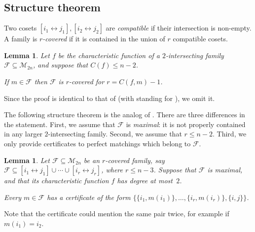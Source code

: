 \documentclass{article}
\newtheorem{lemma}[theorem]{Lemma}
\theoremstyle{definition}
\providecommand{\dcoset}[2]{[#1 \leftrightarrow #2]}
\providecommand{\cM}{\mathcal{M}}
\begin{document}
\subsection{Structure theorem} \label{sec:structure-pms}

Two cosets $\dcoset{i_1}{j_1},\dcoset{i_2}{j_2}$ are \emph{compatible} if their intersection is non-empty. A family is \emph{$r$-covered} if it is contained in the union of $r$ compatible cosets.

\begin{lemma} \label{lem:covering-pms}
Let $f$ be the characteristic function of a $2$-intersecting family $\mathcal{F} \subseteq \cM_{2n}$, and suppose that $C(f) \leq n-2$.

If $m \in \mathcal{F}$ then $\mathcal{F}$ is $r$-covered for $r = C(f,m) - 1$.
\end{lemma}

Since the proof is identical to that of  (with  standing for ), we omit it.

The following structure theorem is the analog of . There are three differences in the statement. First, we assume that $\mathcal{F}$ is \emph{maximal}: it is not properly contained in any larger $2$-intersecting family. Second, we assume that $r \leq n-2$. Third, we only provide certificates to perfect matchings which belong to $\mathcal{F}$.

\begin{lemma} \label{lem:structure-pms}
Let $\mathcal{F} \subseteq \cM_{2n}$ be an $r$-covered family, say $\mathcal{F} \subseteq \dcoset{i_1}{j_1} \cup \cdots \cup \dcoset{i_r}{j_r}$, where $r \leq n-3$. Suppose that $\mathcal{F}$ is maximal, and that its characteristic function $f$ has degree at most~$2$.

Every $m \in \mathcal{F}$ has a certificate of the form $\bigl\{\{i_1,m(i_1)\},\ldots,\{i_r,m(i_r)\},\{i,j\}\bigr\}$.
\end{lemma}

Note that the certificate could mention the same pair twice, for example if $m(i_1) = i_2$.
\end{document}
